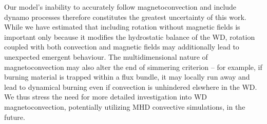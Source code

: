 
Our model's inability to accurately follow magnetoconvection and include dynamo processes therefore constitutes the greatest uncertainty of this work.  While we have estimated that including rotation without magnetic fields is important only because it modifies the hydrostatic balance of the WD, rotation coupled with both convection and magnetic fields may additionally lead to unexpected emergent behaviour.  The multidimensional nature of magnetoconvection may also alter the end of simmering criterion -- for example, if burning material is trapped within a flux bundle, it may locally run away and lead to dynamical burning even if convection is unhindered elswhere in the WD.  We thus stress the need for more detailed investigation into WD magnetoconvection, potentially utilizing MHD convective simulations, in the future.



  




